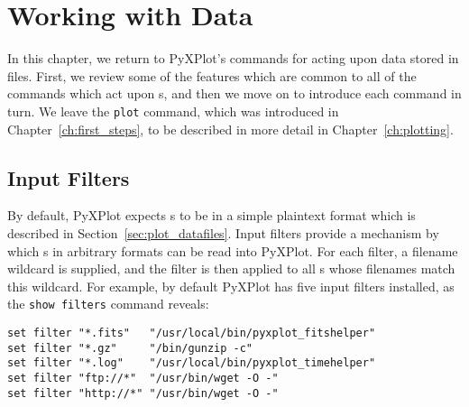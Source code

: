 %
%
%
%
%



\chapter{Working with Data}
\label{ch:numerics}

In this chapter, we return to PyXPlot's commands for acting upon data stored in
files. First, we review some of the features which are common to all of the
commands which act upon \datafile s, and then we move on to introduce each
command in turn. We leave the {\tt plot} command, which was introduced in
Chapter~\ref{ch:first_steps}, to be described in more detail in
Chapter~\ref{ch:plotting}.

\section{Input Filters}
\label{sec:filters}

By default, PyXPlot expects \datafile s to be in a simple plaintext format
which is described in Section~\ref{sec:plot_datafiles}. Input filters provide a
mechanism by which \datafile s in arbitrary formats can be read into PyXPlot.
For each filter, a filename wildcard is supplied, and the filter is then applied to
all \datafile s whose filenames match this wildcard. For example, by default
PyXPlot has five input filters installed, as the {\tt show filters} command
reveals:

\begin{verbatim}
set filter "*.fits"   "/usr/local/bin/pyxplot_fitshelper"
set filter "*.gz"     "/bin/gunzip -c"
set filter "*.log"    "/usr/local/bin/pyxplot_timehelper"
set filter "ftp://*"  "/usr/bin/wget -O -"
set filter "http://*" "/usr/bin/wget -O -"
\end{verbatim}

